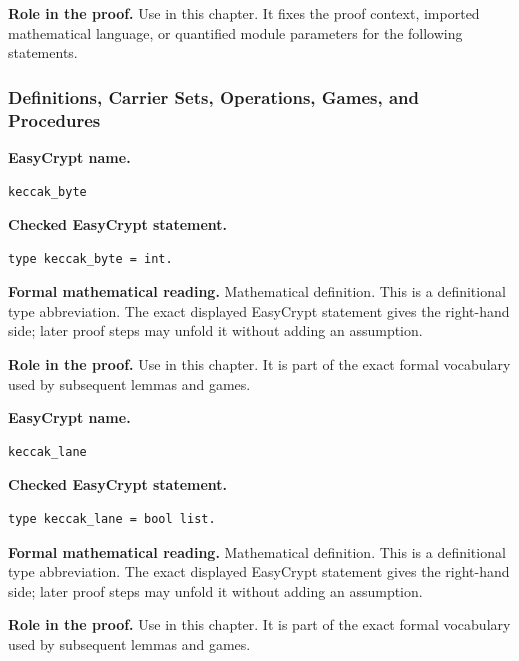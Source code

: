 \noindent\textbf{Role in the proof.}
Use in this chapter. It fixes the proof context, imported mathematical language, or quantified module parameters for the following statements.

\subsubsection*{Definitions, Carrier Sets, Operations, Games, and Procedures}
\begin{formaldefinition}
\noindent\textbf{EasyCrypt name.}
\begin{lstlisting}[language=EasyCrypt,basicstyle=\ttfamily\scriptsize]
keccak_byte
\end{lstlisting}
\noindent\textbf{Checked EasyCrypt statement.}
\begin{lstlisting}[language=EasyCrypt,basicstyle=\ttfamily\scriptsize]
type keccak_byte = int.
\end{lstlisting}
\noindent\textbf{Formal mathematical reading.}
Mathematical definition. This is a definitional type abbreviation.  The exact displayed EasyCrypt statement gives the right-hand side; later proof steps may unfold it without adding an assumption.

\noindent\textbf{Role in the proof.}
Use in this chapter. It is part of the exact formal vocabulary used by subsequent lemmas and games.

\end{formaldefinition}

\begin{formaldefinition}
\noindent\textbf{EasyCrypt name.}
\begin{lstlisting}[language=EasyCrypt,basicstyle=\ttfamily\scriptsize]
keccak_lane
\end{lstlisting}
\noindent\textbf{Checked EasyCrypt statement.}
\begin{lstlisting}[language=EasyCrypt,basicstyle=\ttfamily\scriptsize]
type keccak_lane = bool list.
\end{lstlisting}
\noindent\textbf{Formal mathematical reading.}
Mathematical definition. This is a definitional type abbreviation.  The exact displayed EasyCrypt statement gives the right-hand side; later proof steps may unfold it without adding an assumption.

\noindent\textbf{Role in the proof.}
Use in this chapter. It is part of the exact formal vocabulary used by subsequent lemmas and games.

\end{formaldefinition}

